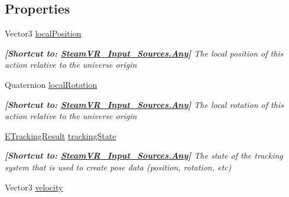 \subsection*{Properties}
\begin{DoxyCompactItemize}
\item 
Vector3 \mbox{\hyperlink{class_valve_1_1_v_r_1_1_steam_v_r___action___pose___base_a532487bde5fc10e4f520822eacaf9b6f}{local\+Position}}
\begin{DoxyCompactList}\small\item\em {\bfseries{\mbox{[}Shortcut to\+: \mbox{\hyperlink{namespace_valve_1_1_v_r_a82e5bf501cc3aa155444ee3f0662853faed36a1ef76a59ee3f15180e0441188ad}{Steam\+V\+R\+\_\+\+Input\+\_\+\+Sources.\+Any}}\mbox{]}}} The local position of this action relative to the universe origin \end{DoxyCompactList}\item 
Quaternion \mbox{\hyperlink{class_valve_1_1_v_r_1_1_steam_v_r___action___pose___base_a6390b371b472fd2f7f4f501db7dacc96}{local\+Rotation}}
\begin{DoxyCompactList}\small\item\em {\bfseries{\mbox{[}Shortcut to\+: \mbox{\hyperlink{namespace_valve_1_1_v_r_a82e5bf501cc3aa155444ee3f0662853faed36a1ef76a59ee3f15180e0441188ad}{Steam\+V\+R\+\_\+\+Input\+\_\+\+Sources.\+Any}}\mbox{]}}} The local rotation of this action relative to the universe origin \end{DoxyCompactList}\item 
\mbox{\hyperlink{namespace_valve_1_1_v_r_abe6feab98f33191b7c27b4292012e90a}{E\+Tracking\+Result}} \mbox{\hyperlink{class_valve_1_1_v_r_1_1_steam_v_r___action___pose___base_af04d371ae8e8552385b022d1aa788d32}{tracking\+State}}
\begin{DoxyCompactList}\small\item\em {\bfseries{\mbox{[}Shortcut to\+: \mbox{\hyperlink{namespace_valve_1_1_v_r_a82e5bf501cc3aa155444ee3f0662853faed36a1ef76a59ee3f15180e0441188ad}{Steam\+V\+R\+\_\+\+Input\+\_\+\+Sources.\+Any}}\mbox{]}}} The state of the tracking system that is used to create pose data (position, rotation, etc) \end{DoxyCompactList}\item 
Vector3 \mbox{\hyperlink{class_valve_1_1_v_r_1_1_steam_v_r___action___pose___base_aaf2089c742c29110276191454cda9c7a}{velocity}}

\end{DoxyCompactItemize}
